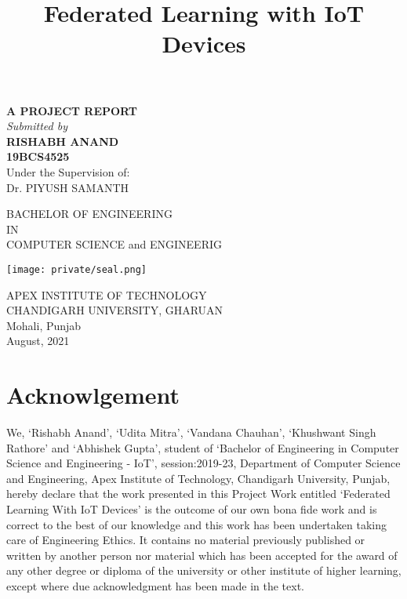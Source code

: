 \documentclass[14pt]{extarticle}
\title{Federated Learning with IoT Devices}
\author{}
\date{}
\newcommand\frontmatter{
    \cleardoublepage
    \pagenumbering{roman}
}
\begin{document}
\frontmatter

\maketitle

\vspace{-7em}

\begin{center}
    \singlespacing
\textbf {A PROJECT REPORT} \\
\emph {Submitted by} \\
\textbf {RISHABH ANAND} \\
\textbf {19BCS4525 }   \\


\vspace{1.5em }
Under the Supervision of:\\
Dr. PIYUSH SAMANTH

\singlespacing

BACHELOR OF ENGINEERING \\
IN \\
COMPUTER SCIENCE and ENGINEERIG

\vspace{1em}
\texttt{[image: private/seal.png]}

\singlespacing

APEX INSTITUTE OF TECHNOLOGY\\
CHANDIGARH UNIVERSITY, GHARUAN\\
Mohali, Punjab \\

\onehalfspacing
August, 2021

\end{center}
\restoregeometry

\newpage
{}
\section*{Acknowlgement}

We, ‘Rishabh Anand’, ‘Udita Mitra’, ‘Vandana Chauhan’, ‘Khushwant Singh Rathore’ and ‘Abhishek Gupta’, student of ‘Bachelor of Engineering in Computer Science and Engineering - IoT’, session:2019-23, Department of Computer Science and Engineering, Apex Institute of Technology, Chandigarh University, Punjab, hereby declare that the work presented in this Project Work entitled ‘Federated Learning With IoT Devices’ is the outcome of our own bona fide work and is correct to the best of our knowledge and this work has been undertaken taking care of Engineering Ethics. It contains no material previously published or written by another person nor material which has been accepted for the award of any other degree or diploma of the university or other institute of higher learning, except where due acknowledgment has been made in the text.
\end{document}
